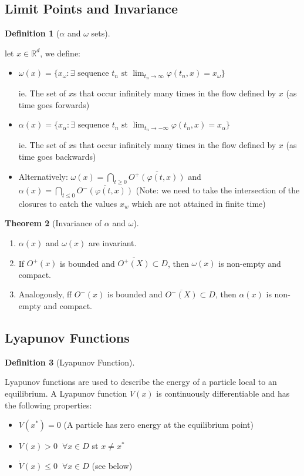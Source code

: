 \documentclass{article}
\newtheorem{thm}{Theorem}[section]
\newtheorem{defn}[thm]{Definition}
\begin{document}
\subsection{Limit Points and Invariance}
\begin{defn}[$\alpha$ and  $\omega$ sets]
\end{defn}
let $x \in \mathbb{R}^d$, we define:
\begin{itemize}
    \item $\omega(x) = \{x_\omega : \exists \text{ sequence } t_n \text{ st } \lim_{t_n\to\infty} \varphi(t_n, x) = x_\omega\}$

    ie. The set of $x$s that occur infinitely many times in the flow defined by $x$ (as time goes forwards)

    \item $\alpha(x) = \{x_\alpha : \exists \text{ sequence } t_n \text{ st } \lim_{t_n\to-\infty} \varphi(t_n, x) = x_\alpha\}$
    

    ie. The set of $x$s that occur infinitely many times in the flow defined by $x$ (as time goes backwards)

    \item Alternatively: $\omega(x) = \bigcap_{t \geq 0} \overline{O^+(\varphi(t, x))}$ and $\alpha(x) = \bigcap_{t \leq 0} \overline{O^-(\varphi(t, x))}$ (Note: we need to take the intersection of the closures to catch the values $x_w$ which are not attained in finite time)
    
\end{itemize}

\begin{thm}[Invariance of $\alpha$ and $\omega$]
\end{thm}
\begin{enumerate}
    \item $\alpha(x)$ and $\omega(x)$ are invariant.
    \item If $O^+(x)$ is bounded and $\overline{O^+(X)} \subset D$, then $\omega(x)$ is non-empty and compact. 
    \item Analogously, ff $O^-(x)$ is bounded and $\overline{O^-(X)} \subset D$, then $\alpha(x)$ is non-empty and compact. 
\end{enumerate}

\newpage
\subsection{Lyapunov Functions}
\begin{defn}[Lyapunov Function]
\end{defn}
Lyapunov functions are used to describe the energy of a particle local to an equilibrium. A Lyapunov function $V(x)$ is continuously differentiable and has the following properties: 
\begin{itemize}
    \item $V(x^*) = 0$ (A particle has zero energy at the equilibrium point) 
    \item $V(x) > 0 \;\;\forall x \in D$ st $x \neq x^*$
    \item $\dot V(x) \leq 0 \;\;\forall x \in D$ (see below)
\end{itemize}
\end{document}
